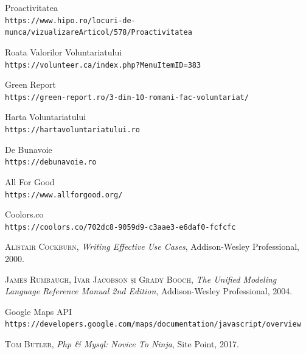 \documentclass[12pt,a4paper]{report}
\begin{document}
\begin{thebibliography}{1}
Proactivitatea
\\\texttt{https://www.hipo.ro/locuri-de-munca/vizualizareArticol/578/Proactivitatea}

Roata Valorilor Voluntariatului
\\\texttt{https://volunteer.ca/index.php?MenuItemID=383}

Green Report
\\\texttt{https://green-report.ro/3-din-10-romani-fac-voluntariat/}

Harta Voluntariatului
\\\texttt{https://hartavoluntariatului.ro}

De Bunavoie
\\\texttt{https://debunavoie.ro}

All For Good
\\\texttt{https://www.allforgood.org/}

Coolors.co
\\\texttt{https://coolors.co/702dc8-9059d9-c3aae3-e6daf0-fcfcfc}

\textsc{Alistair Cockburn}, \emph{Writing Effective Use Cases}, Addison-Wesley Professional, 2000.

\textsc{James Rumbaugh, Ivar Jacobson și Grady Booch}, \emph{The Unified Modeling Language Reference Manual 2nd Edition}, Addison-Wesley Professional, 2004.

Google Maps API
\\\texttt{https://developers.google.com/maps/documentation/javascript/overview}

\textsc{Tom Butler}, \emph{Php \& Mysql: Novice To Ninja}, Site Point, 2017.

\end{thebibliography}
\end{document}
